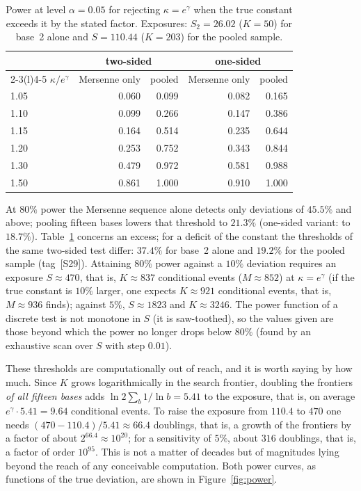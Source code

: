 \documentclass[11pt,a4paper]{article}
\theoremstyle{plain}
\theoremstyle{remark}
\newcommand{\eg}{e^{\gamma}}
\begin{document}
\begin{table}[t]
\centering
\caption{Power at level $\alpha=0.05$ for rejecting $\kappa=\eg$ when the true
constant exceeds it by the stated factor. Exposures: $S_2=26.02$ ($K=50$) for base~2
alone and $S=110.44$ ($K=203$) for the pooled sample.}
\label{tab:power}
\small
\begin{tabular}{lrr@{\qquad}rr}
\toprule
& \multicolumn{2}{c}{two-sided} & \multicolumn{2}{c}{one-sided}\\
\cmidrule(r){2-3}\cmidrule(l){4-5}
$\kappa/\eg$ & Mersenne only & pooled & Mersenne only & pooled\\
\midrule
1.05 & 0.060 & 0.099 & 0.082 & 0.165\\
1.10 & 0.099 & 0.266 & 0.147 & 0.386\\
1.15 & 0.164 & 0.514 & 0.235 & 0.644\\
1.20 & 0.253 & 0.752 & 0.343 & 0.844\\
1.30 & 0.479 & 0.972 & 0.581 & 0.988\\
1.50 & 0.861 & 1.000 & 0.910 & 1.000\\
\bottomrule
\end{tabular}
\end{table}

At $80\%$ power the Mersenne sequence alone detects only deviations of $45.5\%$
and above; pooling fifteen bases lowers that threshold to $21.3\%$ (one-sided
variant: to $18.7\%$). Table~\ref{tab:power} concerns an excess; for a deficit
of the constant the thresholds of the same two-sided test differ: $37.4\%$ for
base~2 alone and $19.2\%$ for the pooled sample (tag~[S29]). Attaining $80\%$ power against a $10\%$ deviation requires
an exposure $S\approx470$, that is, $K\approx837$ conditional events
($M\approx852$) at $\kappa=\eg$ (if the true constant is $10\%$ larger, one
expects $K\approx921$ conditional events, that is, $M\approx936$ finds); against $5\%$, $S\approx1823$ and $K\approx3246$.
The power function of a discrete test is not monotone in $S$ (it is
saw-toothed), so the values given are those beyond which the power no longer
drops below $80\%$ (found by an exhaustive scan over $S$ with step $0.01$).

These thresholds are computationally out of reach, and it is worth saying by how
much. Since $K$ grows logarithmically in the search frontier, doubling the
frontiers \emph{of all fifteen bases} adds $\ln2\sum_b1/\ln b=5.41$ to the
exposure, that is, on average $\eg\cdot5.41=9.64$ conditional events. To raise
the exposure from $110.4$ to $470$ one needs $(470-110.4)/5.41\approx66.4$
doublings, that is, a growth of the frontiers by a factor of about
$2^{66.4}\approx10^{20}$; for a sensitivity of $5\%$, about $316$ doublings, that
is, a factor of order $10^{95}$. This is not a
matter of decades but of magnitudes lying beyond the reach of any conceivable
computation. Both power curves, as functions of the true deviation, are shown in
Figure~\ref{fig:power}.
\end{document}
